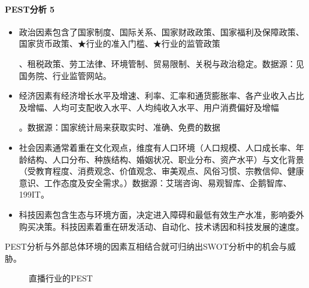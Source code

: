 \documentclass[letterpaper,11pt,english]{sphinxmanual}
\begin{document}
\paragraph{PEST分析 5\sphinxfootnotemark[417]}
\label{\detokenize{chapter_knowledge/BRD:pest-5}}%
\begin{footnotetext}[417]\sphinxAtStartFootnote
{}
%
\end{footnotetext}\ignorespaces \begin{itemize}
\item {} 
政治因素包含了国家制度、国际关系、国家财政政策、国家福利及保障政策、国家货币政策、★行业的准入门槛、★行业的监管政策%
\begin{footnote}[418]\sphinxAtStartFootnote
{}
%
\end{footnote}、租税政策、劳工法律、环境管制、贸易限制、关税与政治稳定。数据源：见国务院、行业监管网站。

\item {} 
经济因素有经济增长水平及增速、利率、汇率和通货膨胀率、各产业收入占比及增幅、人均可支配收入水平、人均纯收入水平、用户消费偏好及增幅%
\begin{footnote}[419]\sphinxAtStartFootnote
{}
%
\end{footnote}。数据源：国家统计局来获取实时、准确、免费的数据

\item {} 
社会因素通常着重在文化观点，维度有人口环境（人口规模、人口成长率、年龄结构、人口分布、种族结构、婚姻状况、职业分布、资产水平）与文化背景（受教育程度、消费观念、价值观念、审美观点、风俗习惯、宗教信仰、健康意识、工作态度及安全需求。）数据源：艾瑞咨询、易观智库、企鹅智库、199IT。

\item {} 
科技因素包含生态与环境方面，决定进入障碍和最低有效生产水准，影响委外购买决策。科技因素着重在研发活动、自动化、技术诱因和科技发展的速度。

\end{itemize}

PEST分析与外部总体环境的因素互相结合就可归纳出SWOT分析中的机会与威胁。

\begin{figure}[H]
\centering
\capstart

\noindent{}
\caption{直播行业的PEST\sphinxfootnotemark[420]}\label{\detokenize{chapter_knowledge/BRD:id22}}\end{figure}
%
\begin{footnotetext}[420]\sphinxAtStartFootnote
{}
%
\end{footnotetext}\ignorespaces 
\end{document}
